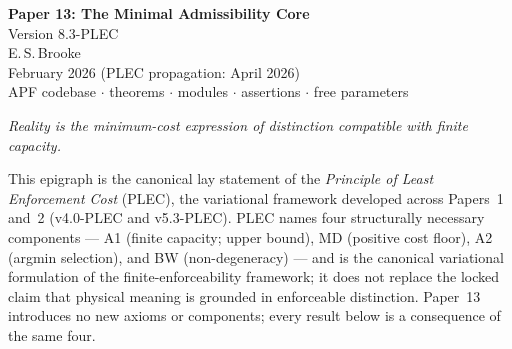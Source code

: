 \documentclass[11pt]{article}
\begin{document}
\thispagestyle{empty}
\begin{center}
  {\LARGE\bfseries Paper 13: The Minimal Admissibility Core}\\[6pt]
  {\Large Version 8.3-PLEC}\\[14pt]
  {\large E.\,S.\,Brooke}\\[4pt]
  {\normalsize February 2026 \quad(PLEC propagation: April 2026)}\\[16pt]
  {\small\sffamily APF codebase \quad$\cdot$ theorems \quad$\cdot$ modules \quad$\cdot$ assertions \quad$\cdot$ free parameters}
\end{center}

\vspace{14pt}

\begin{center}
\textit{Reality is the minimum-cost expression of distinction compatible with finite capacity.}
\end{center}

\vspace{6pt}

\begin{center}
\small\noindent
This epigraph is the canonical lay statement of the \emph{Principle of Least Enforcement Cost} (PLEC), the variational framework developed across Papers~1 and~2 (v4.0-PLEC and v5.3-PLEC).  PLEC names four structurally necessary components --- A1 (finite capacity; upper bound), MD (positive cost floor), A2 (argmin selection), and BW (non-degeneracy) --- and is the canonical variational formulation of the finite-enforceability framework; it does not replace the locked claim that physical meaning is grounded in enforceable distinction.  Paper~13 introduces no new axioms or components; every result below is a consequence of the same four.
\end{center}

\vspace{10pt}
\end{document}
